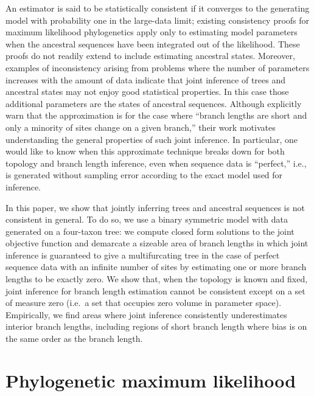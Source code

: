 \documentclass[11pt]{article}
\begin{document}
An estimator is said to be statistically consistent if it converges to the generating model with probability one in the large-data limit; existing consistency proofs for maximum likelihood phylogenetics \citep{Allman2008-wd,Chai2011-ff,RoyChoudhury2015-ta} apply only to estimating model parameters when the ancestral sequences have been integrated out of the likelihood.
These proofs do not readily extend to include estimating ancestral states.
Moreover, examples of inconsistency arising from problems where the number of parameters increases with the amount of data \citep{Neyman1948-tt} indicate that joint inference of trees and ancestral states may not enjoy good statistical properties.
In this case those additional parameters are the states of ancestral sequences.
Although \citet{Sagulenko2018-xl} explicitly warn that the approximation is for the case where ``branch lengths are short and only a minority of sites change on a given branch,'' their work motivates understanding the general properties of such joint inference.
In particular, one would like to know when this approximate technique breaks down for both topology and branch length inference, even when sequence data is ``perfect,'' i.e., is generated without sampling error according to the exact model used for inference.

In this paper, we show that jointly inferring trees and ancestral sequences is not consistent in general.
To do so, we use a binary symmetric model with data generated on a four-taxon tree: we compute closed form solutions to the joint objective function and demarcate a sizeable area of branch lengths in which joint inference is guaranteed to give a multifurcating tree in the case of perfect sequence data with an infinite number of sites by estimating one or more branch lengths to be exactly zero.
We show that, when the topology is known and fixed, joint inference for branch length estimation cannot be consistent except on a set of measure zero (i.e.\ a set that occupies zero volume in parameter space).
Empirically, we find areas where joint inference consistently underestimates interior branch lengths, including regions of short branch length where bias is on the same order as the branch length.

\section*{Phylogenetic maximum likelihood}
\end{document}
